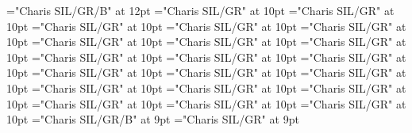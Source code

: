 \documentclass[gps1,twoside]{article}
\begin{document}
\font\spanheadwordreferencedentryreferencedentriescomplexformentryrefcomplexformentryrefsminorentryvariant="Charis SIL/GR/B" at 12pt
\font\spanspandefinitionorglossreferencedentryreferencedentriescomplexformentryrefcomplexformentryrefsminorentryvariantbefore="Charis SIL/GR" at 10pt
\font\spandefinitionorglossreferencedentryreferencedentriescomplexformentryrefcomplexformentryrefsminorentryvariantfirstchildbefore="Charis SIL/GR" at 10pt
\font\spanspansummarycomplexformentryrefcomplexformentryrefsminorentryvariantbefore="Charis SIL/GR" at 10pt
\font\spansummarycomplexformentryrefcomplexformentryrefsminorentryvariantfirstchildbefore="Charis SIL/GR" at 10pt
\font\nontrivialentryrootnontrivialentryrootnontrivialentryrootscomplexformentryrefcomplexformentryrefsminorentryvariantbefore="Charis SIL/GR" at 10pt
\font\nontrivialentryrootscomplexformentryrefcomplexformentryrefsminorentryvariantbefore="Charis SIL/GR" at 10pt
\font\spanspansummarydefinitionminorentryvariantbefore="Charis SIL/GR" at 10pt
\font\spansummarydefinitionminorentryvariantfirstchildbefore="Charis SIL/GR" at 10pt
\font\spansummarydefinitionminorentryvariantlastchildafter="Charis SIL/GR" at 10pt
\font\spanspanvisiblecomplexformbackrefsminorentryvariantbefore="Charis SIL/GR" at 10pt
\font\visiblecomplexformbackrefsminorentryvariantbefore="Charis SIL/GR" at 10pt
\font\visiblecomplexformbackrefsminorentryvariantafter="Charis SIL/GR" at 10pt
\font\complexformtypesvisiblecomplexformbackrefvisiblecomplexformbackrefsminorentryvariantafter="Charis SIL/GR" at 10pt
\font\spanspanreverseabbrcomplexformtypecomplexformtypesvisiblecomplexformbackrefvisiblecomplexformbackrefsminorentryvariantbefore="Charis SIL/GR" at 10pt
\font\spanspanheadwordvisiblecomplexformbackrefvisiblecomplexformbackrefsminorentryvariantbefore="Charis SIL/GR" at 10pt
\font\spanspandefinitionorglossesvisiblecomplexformbackrefvisiblecomplexformbackrefsminorentryvariantbefore="Charis SIL/GR" at 10pt
\font{}="Charis SIL/GR" at 10pt
\font\spanspanowningentrysummarydefinitionvisiblecomplexformbackrefvisiblecomplexformbackrefsminorentryvariantbefore="Charis SIL/GR" at 10pt
\font\spanowningentrysummarydefinitionvisiblecomplexformbackrefvisiblecomplexformbackrefsminorentryvariantfirstchildbefore="Charis SIL/GR" at 10pt
\font\spanowningentrysummarydefinitionvisiblecomplexformbackrefvisiblecomplexformbackrefsminorentryvariantlastchildafter="Charis SIL/GR" at 10pt
\font\xitemxitemcrossrefbefore="Charis SIL/GR/B" at 9pt
\font\xitemxitemcrossreftargetsbefore="Charis SIL/GR" at 9pt
\end{document}
